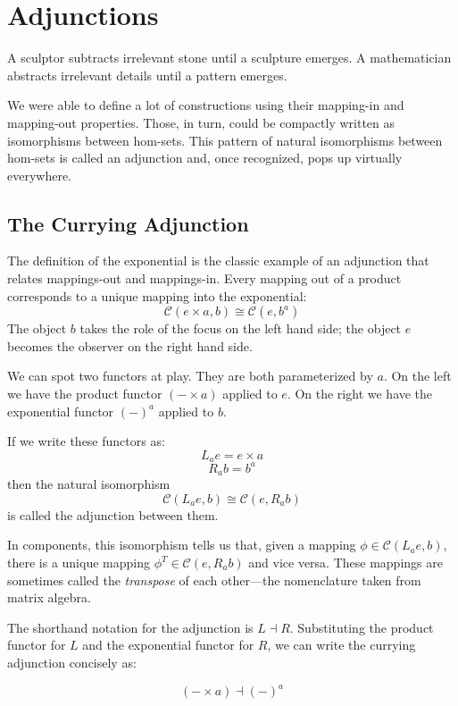 \documentclass[DaoFP]{subfiles}
\begin{document}
\setcounter{chapter}{9}

\chapter{Adjunctions}

A sculptor subtracts irrelevant stone until a sculpture emerges. A mathematician abstracts irrelevant details until a pattern emerges.

We were able to define a lot of constructions using their mapping-in and mapping-out properties. Those, in turn, could be compactly written as isomorphisms between hom-sets. This pattern of natural isomorphisms between hom-sets is called an adjunction and, once recognized, pops up virtually everywhere.

\section{The Currying Adjunction}

The definition of the exponential is the classic example of an adjunction that relates mappings-out and mappings-in. Every mapping out of a product corresponds to a unique mapping into the exponential:
\[  \mathcal{C}(e \times a, b ) \cong  \mathcal{C} (e, b^a)  \]
The object $b$ takes the role of the focus on the left hand side; the object $e$ becomes the observer on the right hand side. 

We can spot two functors at play. They are both parameterized by $a$. On the left we have the product functor $(- \times a)$ applied to $e$. On the right we have the exponential functor $(-)^a$ applied to $b$. 

If we write these functors as:
\[ L_a e = e \times a \]
\[ R_a b = b^a \]
then the natural isomorphism
\[ \mathcal{C}(L_a e, b) \cong \mathcal{C}(e, R_a b) \]
is called the adjunction between them. 

In components, this isomorphism tells us that, given a mapping $\phi \in \mathcal{C}(L_a e, b)$, there is a unique mapping $\phi^T \in \mathcal{C}(e, R_a b)$ and vice versa. These mappings are sometimes called the \emph{transpose} of each other---the nomenclature taken from matrix algebra.

The shorthand notation for the adjunction is $L \dashv R$. Substituting the product functor for $L$ and the exponential functor for $R$, we can write the currying adjunction concisely as:

\[ (- \times a) \dashv (-)^a \]
\end{document}
